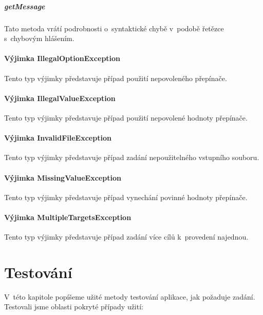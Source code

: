 \documentclass[thesis=B,czech,hidelinks]{thesis}[2012/06/26]
\begin{document}
\paragraph{getMessage}

Tato metoda vrátí podrobnosti o~syntaktické chybě v~podobě řetězce s~chybovým hlášením.

\subsubsection{Výjimka IllegalOptionException}

Tento typ výjimky představuje případ použití nepovoleného přepínače.

\subsubsection{Výjimka IllegalValueException}

Tento typ výjimky představuje případ použití nepovolené hodnoty přepínače.

\subsubsection{Výjimka InvalidFileException}

Tento typ výjimky představuje případ zadání nepoužitelného vstupního souboru.

\subsubsection{Výjimka MissingValueException}

Tento typ výjimky představuje případ vynechání povinné hodnoty přepínače.

\subsubsection{Výjimka MultipleTargetsException}

Tento typ výjimky představuje případ zadání více cílů k~provedení najednou.

%
%
%

\chapter{Testování}

V~této kapitole popíšeme užité metody testování aplikace, jak požaduje zadání. Testovali jsme oblasti pokryté případy užití:
\end{document}
